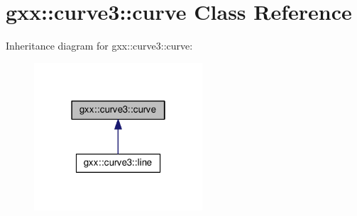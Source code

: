 \hypertarget{classgxx_1_1curve3_1_1curve}{}\section{gxx\+:\+:curve3\+:\+:curve Class Reference}
\label{classgxx_1_1curve3_1_1curve}


Inheritance diagram for gxx\+:\+:curve3\+:\+:curve\+:
\nopagebreak
\begin{figure}[H]
\begin{center}
\leavevmode
\includegraphics[width=178pt]{classgxx_1_1curve3_1_1curve__inherit__graph}
\end{center}
\end{figure}
